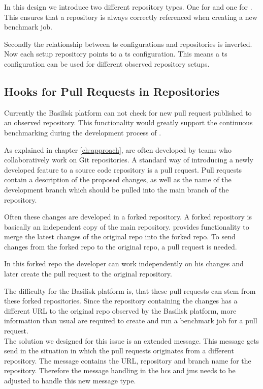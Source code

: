 In this design we introduce two different repository types.
One for \gh{} and one for \dockh{}.
This ensures that a repository is always correctly referenced when creating a new benchmark job.

Secondly the relationship between \ac{ts} configurations and repositories is inverted. 
Now each setup repository points to a \ac{ts} configuration.
This means a \ac{ts} configuration can be used for different observed repository setups.




\subsection{Hooks for Pull Requests in \gh{} Repositories}
Currently the Basilisk platform can not check for new pull request published to an observed repository.
This functionality would greatly support the continuous benchmarking during the development process of \tsp{}.

As explained in chapter \ref{ch:approach}, \tsp{} are often developed by teams who collaboratively work on Git repositories.
A standard way of introducing a newly developed feature to a source code repository is a pull request.
Pull requests contain a description of the proposed changes, as well as the name of the development branch which should be pulled into the main branch of the repository.

Often these changes are developed in a forked repository.
A forked repository is basically an independent copy of the main repository.
\gh{} provides functionality to merge the latest changes of the original repo into the forked repo.
To send changes from the forked repo to the original repo, a pull request is needed.

In this forked repo the developer can work independently on his changes and later create the pull request to the original repository.

The difficulty for the Basilisk platform is, that these pull requests can stem from these forked repositories.
Since the repository containing the changes has a different URL to the original repo observed by the Basilisk platform, more information than usual are required to create and run a benchmark job for a pull request.
\\

The solution we designed for this issue is an extended message.
This message gets send in the situation in which the pull requests originates from a different repository.
The message contains the URL, repository and branch name for the \gh{} repository.
Therefore the message handling in the \ac{hcs} and \ac{jms} needs to be adjusted to handle this new message type.

